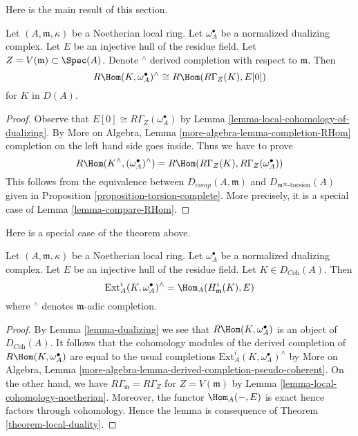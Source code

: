 \noindent
Here is the main result of this section.

\begin{theorem}
\label{theorem-local-duality}
Let $(A, \mathfrak m, \kappa)$ be a Noetherian local ring.
Let $\omega_A^\bullet$ be a normalized dualizing complex.
Let $E$ be an injective hull of the residue field.
Let $Z = V(\mathfrak m) \subset \Spec(A)$.
Denote ${}^\wedge$ derived completion with respect to $\mathfrak m$.
Then
$$
R\Hom(K, \omega_A^\bullet)^\wedge \cong R\Hom(R\Gamma_Z(K), E[0])
$$
for $K$ in $D(A)$.
\end{theorem}

\begin{proof}
Observe that $E[0] \cong R\Gamma_Z(\omega_A^\bullet)$ by
Lemma \ref{lemma-local-cohomology-of-dualizing}.
By More on Algebra, Lemma \ref{more-algebra-lemma-completion-RHom}
completion on the left hand side goes inside.
Thus we have to prove
$$
R\Hom(K^\wedge, (\omega_A^\bullet)^\wedge)
=
R\Hom(R\Gamma_Z(K), R\Gamma_Z(\omega_A^\bullet))
$$
This follows from the equivalence between
$D_{comp}(A, \mathfrak m)$ and $D_{\mathfrak m^\infty\text{-torsion}}(A)$
given in Proposition \ref{proposition-torsion-complete}.
More precisely, it is a special case of Lemma \ref{lemma-compare-RHom}.
\end{proof}

\noindent
Here is a special case of the theorem above.

\begin{lemma}
\label{lemma-special-case-local-duality}
Let $(A, \mathfrak m, \kappa)$ be a Noetherian local ring.
Let $\omega_A^\bullet$ be a normalized dualizing complex.
Let $E$ be an injective hull of the residue field.
Let $K \in D_{\textit{Coh}}(A)$. Then
$$
\text{Ext}^i_A(K, \omega_A^\bullet)^\wedge =
\Hom_A(H^i_{\mathfrak m}(K), E)
$$
where ${}^\wedge$ denotes $\mathfrak m$-adic completion.
\end{lemma}

\begin{proof}
By Lemma \ref{lemma-dualizing} we see that $R\Hom(K, \omega_A^\bullet)$
is an object of $D_{\textit{Coh}}(A)$.
It follows that the cohomology modules of the derived completion
of $R\Hom(K, \omega_A^\bullet)$ are equal to the usual completions
$\text{Ext}^i_A(K, \omega_A^\bullet)^\wedge$ by
More on Algebra, Lemma
\ref{more-algebra-lemma-derived-completion-pseudo-coherent}.
On the other hand, we have $R\Gamma_{\mathfrak m} = R\Gamma_Z$
for $Z = V(\mathfrak m)$ by Lemma \ref{lemma-local-cohomology-noetherian}.
Moreover, the functor $\Hom_A(-, E)$ is exact hence
factors through cohomology.
Hence the lemma is consequence of
Theorem \ref{theorem-local-duality}.
\end{proof}






